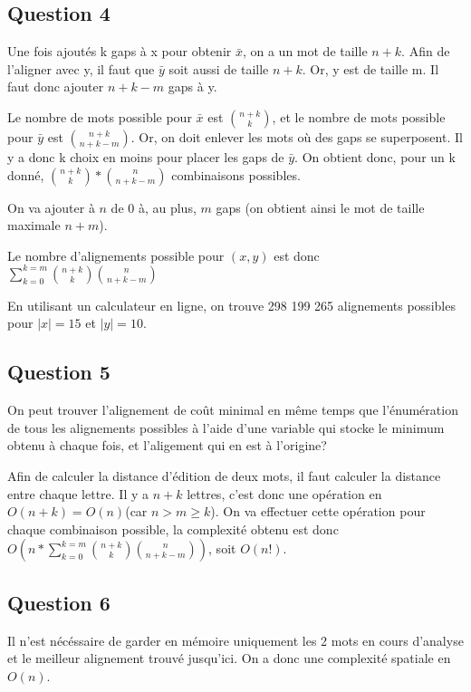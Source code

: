 \documentclass{report}
\begin{document}
\subsection*{Question 4}
Une fois ajoutés k gaps à x pour obtenir $\bar{x}$, on a un mot de taille $n+k$. Afin de l'aligner avec y, il faut que $\bar{y}$ soit aussi de taille $n+k$. Or, y est de taille m. Il faut donc ajouter $n+k-m$ gaps à y.

Le nombre de mots possible pour $\bar{x}$ est $\binom{n+k}{k}$, et le nombre de mots possible pour $\bar{y}$ est  $\binom{n+k}{n+k-m}$. Or, on doit enlever les mots où des gaps se superposent. Il y a donc k choix en moins pour placer les gaps de $\bar{y}$. On obtient donc, pour un k donné, $\binom{n+k}{k}*\binom{n}{n+k-m}$ combinaisons possibles.

On va ajouter à $n$ de 0 à, au plus, $m$ gaps (on obtient ainsi le mot de taille maximale $n+m$).

Le nombre d'alignements possible pour $(x,y)$ est donc $ \sum_{k=0}^{k=m}\binom{n+k}{k}\binom{n}{n+k-m}$

En utilisant un calculateur en ligne, on trouve 298 199 265 alignements possibles pour $|x|=15$ et $|y|=10$.

\subsection*{Question 5}
On peut trouver l'alignement de coût minimal en même temps que l'énumération de tous les alignements possibles à l'aide d'une variable qui stocke le minimum obtenu à chaque fois, et l'aligement qui en est à l'origine?

Afin de calculer la distance d'édition de deux mots, il faut calculer la distance entre chaque lettre. Il y a $n+k$ lettres, c'est donc une opération en $O(n+k)=O(n)$(car $n>m\ge k$). On va effectuer cette opération pour chaque combinaison possible, la complexité obtenu est donc $O(n*\sum_{k=0}^{k=m}\binom{n+k}{k}\binom{n}{n+k-m})$, soit $O(n!)$.


\subsection*{Question 6}
Il n'est nécéssaire de garder en mémoire uniquement les 2 mots en cours d'analyse et le meilleur alignement trouvé jusqu'ici. On a donc une complexité spatiale en $O(n)$.
\end{document}

